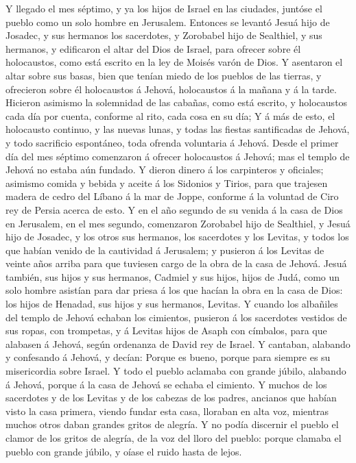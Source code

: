  Y llegado el mes séptimo, y ya los hijos de Israel en las
ciudades, juntóse el pueblo como un solo hombre en Jerusalem.
 Entonces se levantó Jesuá hijo de Josadec, y sus hermanos
los sacerdotes, y Zorobabel hijo de Sealthiel, y sus hermanos, y
edificaron el altar del Dios de Israel, para ofrecer sobre él
holocaustos, como está escrito en la ley de Moisés varón de Dios.
 Y asentaron el altar sobre sus basas, bien que tenían
miedo de los pueblos de las tierras, y ofrecieron sobre él holocaustos á
Jehová, holocaustos á la mañana y á la tarde.  Hicieron
asimismo la solemnidad de las cabañas, como está escrito, y holocaustos
cada día por cuenta, conforme al rito, cada cosa en su día;
 Y á más de esto, el holocausto continuo, y las nuevas
lunas, y todas las fiestas santificadas de Jehová, y todo sacrificio
espontáneo, toda ofrenda voluntaria á Jehová.  Desde el
primer día del mes séptimo comenzaron á ofrecer holocaustos á Jehová;
mas el templo de Jehová no estaba aún fundado.  Y dieron
dinero á los carpinteros y oficiales; asimismo comida y bebida y aceite
á los Sidonios y Tirios, para que trajesen madera de cedro del Líbano á
la mar de Joppe, conforme á la voluntad de Ciro rey de Persia acerca de
esto.  Y en el año segundo de su venida á la casa de Dios
en Jerusalem, en el mes segundo, comenzaron Zorobabel hijo de Sealthiel,
y Jesuá hijo de Josadec, y los otros sus hermanos, los sacerdotes y los
Levitas, y todos los que habían venido de la cautividad á Jerusalem; y
pusieron á los Levitas de veinte años arriba para que tuviesen cargo de
la obra de la casa de Jehová.  Jesuá también, sus hijos y
sus hermanos, Cadmiel y sus hijos, hijos de Judá, como un solo hombre
asistían para dar priesa á los que hacían la obra en la casa de Dios:
los hijos de Henadad, sus hijos y sus hermanos, Levitas. 
Y cuando los albañiles del templo de Jehová echaban los cimientos,
pusieron á los sacerdotes vestidos de sus ropas, con trompetas, y á
Levitas hijos de Asaph con címbalos, para que alabasen á Jehová, según
ordenanza de David rey de Israel.  Y cantaban, alabando y
confesando á Jehová, y decían: Porque es bueno, porque para siempre es
su misericordia sobre Israel. Y todo el pueblo aclamaba con grande
júbilo, alabando á Jehová, porque á la casa de Jehová se echaba el
cimiento.  Y muchos de los sacerdotes y de los Levitas y
de los cabezas de los padres, ancianos que habían visto la casa primera,
viendo fundar esta casa, lloraban en alta voz, mientras muchos otros
daban grandes gritos de alegría.  Y no podía discernir el
pueblo el clamor de los gritos de alegría, de la voz del lloro del
pueblo: porque clamaba el pueblo con grande júbilo, y oíase el ruido
hasta de lejos.

